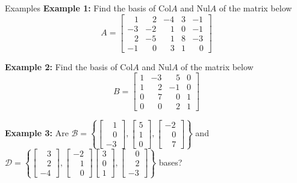 \documentclass[10pt, aspectratio=169]{beamer}
\begin{document}
\begin{frame}{Examples}
    \textbf{Example 1:} Find the basis of Col\(A\) and Nul\(A\) of the matrix below
    \[
    A = \begin{bmatrix}
        \;\;\;1 & \;\;\;2 & -4 & 3 & -1\\
        -3 & -2 & \;\;\;1 & 0 & -1\\
        \;\;\;2 & -5 & \;\;\;1 & 8 & -3\\
        -1 & \;\;\; 0 & \;\;\; 3 & 1 & \;\;\; 0
    \end{bmatrix}
    \]

    \textbf{Example 2:} Find the basis of Col\(A\) and Nul\(A\) of the matrix below
    \[
    B = \begin{bmatrix}
        1 & -3 & \;\;\;5 & 0\\
        1 & \;\;\;2 & -1 & 0\\
        0 & \;\;\;7 & \;\;\;0 & 1 \\
        0 & \;\;\;0 & \;\;\;2 &  1
    \end{bmatrix}
    \]

    \textbf{Example 3:} Are
    \(
    \mathcal{B} = \left\{
    \begin{bmatrix} \;\;\;1\\\;\;\;0\\-3 \end{bmatrix},
    \begin{bmatrix} 5\\1\\0 \end{bmatrix},
    \begin{bmatrix} -2\\\;\;\;0\\\;\;\;7 \end{bmatrix}
    \right\}
    \)
    and 
    \(
    \mathcal{D} = \left\{
    \begin{bmatrix} \;\;\;3\\\;\;\;2\\-4 \end{bmatrix},
    \begin{bmatrix} -2\\\;\;\;1\\\;\;\;0 \end{bmatrix}
    \begin{bmatrix} 3\\0\\1 \end{bmatrix},
    \begin{bmatrix} \;\;\;0\\\;\;\;2\\-3 \end{bmatrix}
    \right\}
    \)
    bases?
    \end{frame}
\end{document}
